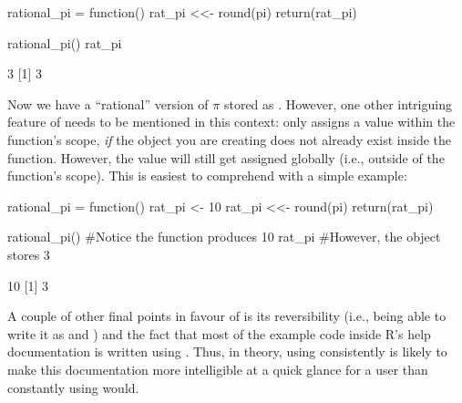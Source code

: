 \begin{inR}
rational_pi = function() {
  rat_pi <<- round(pi)
  return(rat_pi)
}

rational_pi()
rat_pi
\end{inR}

\begin{outR}
[1] 3
[1] 3
\end{outR}

\noindent
Now we have a ``rational'' version of $\pi$ stored as .  However, one other intriguing feature of \R{{<}<-} needs to be mentioned in this context: \R{{<}<-} only assigns a value within the function's scope, \textit{if} the object you are creating does not already exist inside the function. However, the value will still get assigned globally (i.e., outside of the function's scope).  This is easiest to comprehend with a simple example:

\begin{inR}
rational_pi = function() {
  rat_pi <- 10
  rat_pi <<- round(pi)
  return(rat_pi)
}

rational_pi() #Notice the function produces 10
rat_pi #However, the object stores 3
\end{inR}
\begin{outR}
[1] 10
[1] 3
\end{outR}

A couple of other final points in favour of  \R{<-} is its reversibility (i.e., being able to write it as \R{->} and \R{->{>}}) and the fact that most of the example code inside R's help documentation is written using \R{<-}. Thus, in theory, using \R{<-} consistently is likely to make this documentation more intelligible at a quick glance for a user than constantly using \R{=} would.
